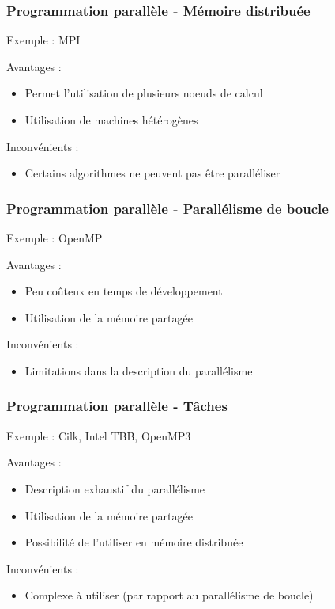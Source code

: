 \documentclass{beamer}
\begin{document}
\begin{frame}
  \frametitle{Programmation parallèle - Mémoire distribuée}
  Exemple : MPI
  \bigskip

  Avantages :
  \begin{itemize}
    \item Permet l'utilisation de plusieurs noeuds de calcul
    \item Utilisation de machines hétérogènes
  \end{itemize}

  Inconvénients :
  \begin{itemize}
    \item Certains algorithmes ne peuvent pas être paralléliser
  \end{itemize}
\end{frame}



\begin{frame}
  \frametitle{Programmation parallèle - Parallélisme de boucle}
  Exemple : OpenMP
  \bigskip

  Avantages :
  \begin{itemize}
    \item Peu coûteux en temps de développement
    \item Utilisation de la mémoire partagée
  \end{itemize}

  Inconvénients :
  \begin{itemize}
    \item Limitations dans la description du parallélisme
  \end{itemize}
\end{frame}



\begin{frame}
  \frametitle{Programmation parallèle - Tâches}
  Exemple : Cilk, Intel TBB, OpenMP3
  \bigskip

  Avantages :
  \begin{itemize}
    \item Description exhaustif du parallélisme
    \item Utilisation de la mémoire partagée
    \item Possibilité de l'utiliser en mémoire distribuée
  \end{itemize}

  Inconvénients :
  \begin{itemize}
    \item Complexe à utiliser (par rapport au parallélisme de boucle)
  \end{itemize}
\end{frame}
\end{document}
